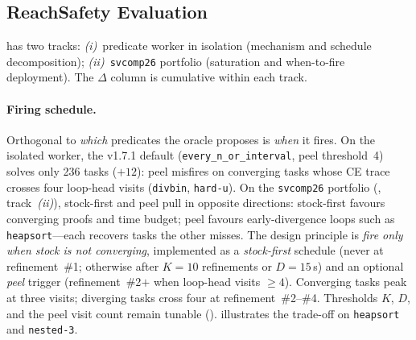 \documentclass[runningheads]{llncs}
\begin{document}
\subsection{ReachSafety Evaluation}
\label{sec:scheduling}

 has two tracks: \emph{(i)}~predicate worker in isolation (mechanism and
schedule decomposition); \emph{(ii)}~\texttt{svcomp26} portfolio (saturation and when-to-fire
deployment). The $\Delta$ column is cumulative within each track.

\paragraph{Firing schedule.} Orthogonal to \emph{which} predicates the oracle proposes is
\emph{when} it fires. On the isolated worker, the v1.7.1 default
(\texttt{every\_n\_or\_interval}, peel threshold~4) solves only 236 tasks ($+12$): peel
misfires on converging tasks whose CE trace crosses four loop-head visits
(\texttt{divbin}, \texttt{hard-u}). On the \texttt{svcomp26} portfolio (,
track~\emph{(ii)}), stock-first and peel pull in opposite directions: stock-first favours
converging proofs and time budget; peel favours early-divergence loops such as
\texttt{heapsort}---each recovers tasks the other misses. The design principle is \emph{fire
only when stock is not converging}, implemented as a \emph{stock-first} schedule (never at
refinement~\#1; otherwise after $K{=}10$ refinements or $D{=}15$\,s) and an optional \emph{peel}
trigger (refinement~\#2$+$ when loop-head visits $\ge 4$). Converging tasks peak at three visits;
diverging tasks cross four at refinement~\#2--\#4. Thresholds $K$, $D$, and the peel visit count
remain tunable ().  illustrates the trade-off on
\texttt{heapsort} and \texttt{nested-3}.
\end{document}
